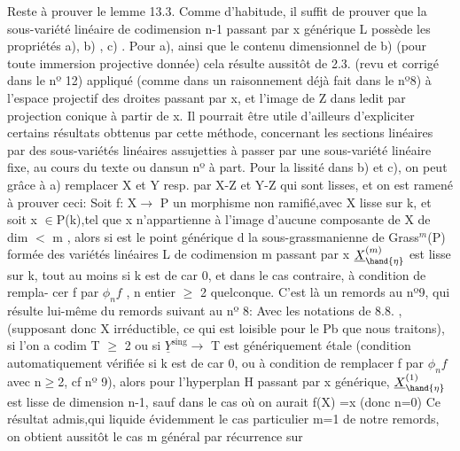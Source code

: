 
Reste à prouver le lemme 13.3.  Comme d'habitude, il suffit de prouver
que  la sous-variété linéaire de codimension n-1  passant par x générique
L\unsure{,}  possède les propriétés  a), b) , c) .  Pour  a), ainsi que le contenu dimensionnel de b)  (pour toute immersion projective donnée) cela résulte
\hand{[}aussitôt de 2.3. (revu et corrigé dans le nº 12)  appliqué (comme dans un
raisonnement déjà fait dans le nº8) à l'espace projectif  des droites
passant par x, et l'image de Z dans ledit par projection conique à
partir de x. \hand{[}Il pourrait être utile d'ailleurs d'expliciter certains
\placedmargin{|} résultats obttenus par cette méthode, concernant les sections linéaires
par des sous-variétés linéaires assujetties à passer par une sous-variété
linéaire fixe,  au cours du texte ou dans\hand{/}un nº à part\hand{]}.  Pour la lissité dans b) et c),
 on peut grâce à a)  remplacer X et Y  resp. par X-Z et Y-Z
qui sont lisses, et on est  ramené à prouver ceci:  Soit f: X$\rightarrow$ P un
morphisme non ramifié,\hand{(}avec X lisse sur k, et soit  x $\in$P(k),tel que x n'appartienne à l'image d'aucune composante de X de dim $<$ m , alors si
\hand{$\eta$} est le point générique  d  la sous-grassmanienne  de Grass$^{m}$(P)
formée des variétés linéaires L de codimension m passant par  x
 \unsure{\&} $\underline{X}^{(m)}_{\hand{\eta}}$ est  lisse sur k, tout au
\placedmargin{(} moins si k est de car 0, et dans le cas contraire, à condition de rempla-%
cer f par $\phi_{n}f$ , n entier $\geq$ 2 quelconque.  C'est là  un remords au nº9,
qui résulte lui-même du remords suivant au nº 8:  Avec les notations de
8.8. , (supposant donc X irréductible, ce qui est loisible pour le Pb
que nous traitons), si  l'on a codim T $\geq$ 2  ou si  $\underline{Y}^{\text{sing}}\rightarrow$ T  est
génériquement étale (condition automatiquement vérifiée si k est de car 0,
ou à condition de remplacer f par $\phi_{n}f$ avec n$\geq$2, cf nº 9), alors pour
l'hyperplan  H\hand{$_{\eta}$} passant par x  générique,  $\underline{X}^{(1)}_{\hand{\eta}}$ est lisse
de dimension n-1,  sauf dans le cas  où  on aurait  f(X) =\hand{$\{$}x\hand{$\}$}  (donc n=0)
Ce résultat admis,\hand{(}qui liquide évidemment le cas particulier m=1 de
notre remords, on obtient aussitôt le cas  m général  par récurrence sur

